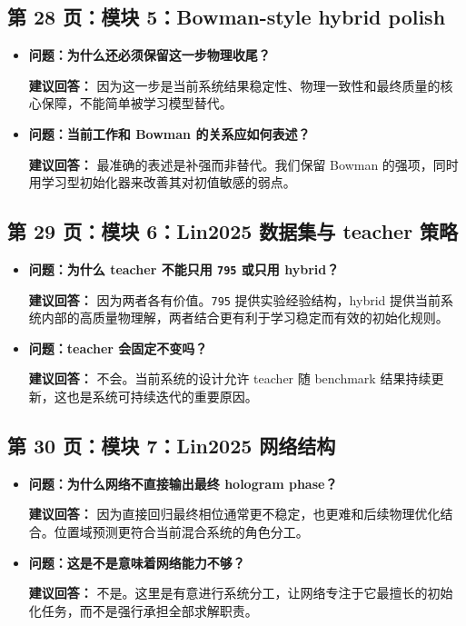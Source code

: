\documentclass[12pt,a4paper]{ctexart}
\begin{document}
\subsection{第 28 页：模块 5：Bowman-style hybrid polish}
\begin{itemize}
\item \textbf{问题：为什么还必须保留这一步物理收尾？}

\textbf{建议回答：} 因为这一步是当前系统结果稳定性、物理一致性和最终质量的核心保障，不能简单被学习模型替代。

\item \textbf{问题：当前工作和 Bowman 的关系应如何表述？}

\textbf{建议回答：} 最准确的表述是补强而非替代。我们保留 Bowman 的强项，同时用学习型初始化器来改善其对初值敏感的弱点。
\end{itemize}

\subsection{第 29 页：模块 6：Lin2025 数据集与 teacher 策略}
\begin{itemize}
\item \textbf{问题：为什么 teacher 不能只用 \texttt{795} 或只用 hybrid？}

\textbf{建议回答：} 因为两者各有价值。\texttt{795} 提供实验经验结构，hybrid 提供当前系统内部的高质量物理解，两者结合更有利于学习稳定而有效的初始化规则。

\item \textbf{问题：teacher 会固定不变吗？}

\textbf{建议回答：} 不会。当前系统的设计允许 teacher 随 benchmark 结果持续更新，这也是系统可持续迭代的重要原因。
\end{itemize}

\subsection{第 30 页：模块 7：Lin2025 网络结构}
\begin{itemize}
\item \textbf{问题：为什么网络不直接输出最终 hologram phase？}

\textbf{建议回答：} 因为直接回归最终相位通常更不稳定，也更难和后续物理优化结合。位置域预测更符合当前混合系统的角色分工。

\item \textbf{问题：这是不是意味着网络能力不够？}

\textbf{建议回答：} 不是。这里是有意进行系统分工，让网络专注于它最擅长的初始化任务，而不是强行承担全部求解职责。
\end{itemize}
\end{document}
